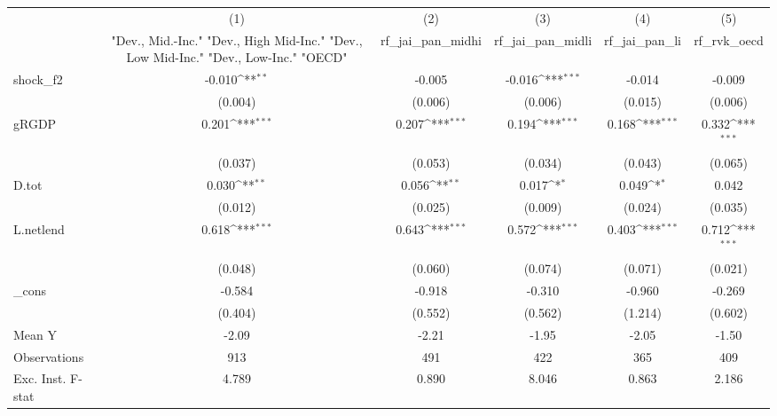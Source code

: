 {
\def\sym#1{\ifmmode^{#1}\else\(^{#1}\)\fi}
\begin{tabular}{l*{5}{c}}
\toprule
            &\multicolumn{1}{c}{(1)}&\multicolumn{1}{c}{(2)}&\multicolumn{1}{c}{(3)}&\multicolumn{1}{c}{(4)}&\multicolumn{1}{c}{(5)}\\
            &\multicolumn{1}{c}{ "Dev., Mid.-Inc." "Dev., High Mid-Inc." "Dev., Low Mid-Inc." "Dev., Low-Inc." "OECD" }&\multicolumn{1}{c}{rf\_jai\_pan\_midhi}&\multicolumn{1}{c}{rf\_jai\_pan\_midli}&\multicolumn{1}{c}{rf\_jai\_pan\_li}&\multicolumn{1}{c}{rf\_rvk\_oecd}\\
\midrule
shock\_f2    &      -0.010\sym{**} &      -0.005         &      -0.016\sym{***}&      -0.014         &      -0.009         \\
            &     (0.004)         &     (0.006)         &     (0.006)         &     (0.015)         &     (0.006)         \\
\addlinespace
gRGDP       &       0.201\sym{***}&       0.207\sym{***}&       0.194\sym{***}&       0.168\sym{***}&       0.332\sym{***}\\
            &     (0.037)         &     (0.053)         &     (0.034)         &     (0.043)         &     (0.065)         \\
\addlinespace
D.tot       &       0.030\sym{**} &       0.056\sym{**} &       0.017\sym{*}  &       0.049\sym{*}  &       0.042         \\
            &     (0.012)         &     (0.025)         &     (0.009)         &     (0.024)         &     (0.035)         \\
\addlinespace
L.netlend   &       0.618\sym{***}&       0.643\sym{***}&       0.572\sym{***}&       0.403\sym{***}&       0.712\sym{***}\\
            &     (0.048)         &     (0.060)         &     (0.074)         &     (0.071)         &     (0.021)         \\
\addlinespace
\_cons      &      -0.584         &      -0.918         &      -0.310         &      -0.960         &      -0.269         \\
            &     (0.404)         &     (0.552)         &     (0.562)         &     (1.214)         &     (0.602)         \\
\midrule
Mean Y      &       -2.09         &       -2.21         &       -1.95         &       -2.05         &       -1.50         \\
Observations&         913         &         491         &         422         &         365         &         409         \\
Exc. Inst. F-stat&       4.789         &       0.890         &       8.046         &       0.863         &       2.186         \\
\bottomrule
\end{tabular}
}
